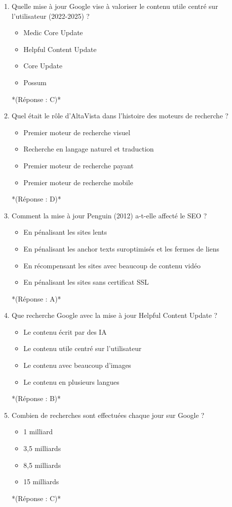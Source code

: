 \documentclass[12pt,a4paper,twoside]{report}
\begin{document}
\begin{enumerate}
\item Quelle mise à jour Google vise à valoriser le contenu utile centré sur l'utilisateur (2022-2025) ?
\begin{itemize}
\item[A)] Medic Core Update
\item[B)] Helpful Content Update
\item[C)] Core Update
\item[D)] Possum
\end{itemize}
*(Réponse : C)*

\item Quel était le rôle d'AltaVista dans l'histoire des moteurs de recherche ?
\begin{itemize}
\item[A)] Premier moteur de recherche visuel
\item[B)] Recherche en langage naturel et traduction
\item[C)] Premier moteur de recherche payant
\item[D)] Premier moteur de recherche mobile
\end{itemize}
*(Réponse : D)*

\item Comment la mise à jour Penguin (2012) a-t-elle affecté le SEO ?
\begin{itemize}
\item[A)] En pénalisant les sites lents
\item[B)] En pénalisant les anchor texts suroptimisés et les fermes de liens
\item[C)] En récompensant les sites avec beaucoup de contenu vidéo
\item[D)] En pénalisant les sites sans certificat SSL
\end{itemize}
*(Réponse : A)*

\item Que recherche Google avec la mise à jour Helpful Content Update ?
\begin{itemize}
\item[A)] Le contenu écrit par des IA
\item[B)] Le contenu utile centré sur l'utilisateur
\item[C)] Le contenu avec beaucoup d'images
\item[D)] Le contenu en plusieurs langues
\end{itemize}
*(Réponse : B)*

\item Combien de recherches sont effectuées chaque jour sur Google ?
\begin{itemize}
\item[A)] 1 milliard
\item[B)] 3,5 milliards
\item[C)] 8,5 milliards
\item[D)] 15 milliards
\end{itemize}
*(Réponse : C)*


\end{enumerate}
\end{document}
